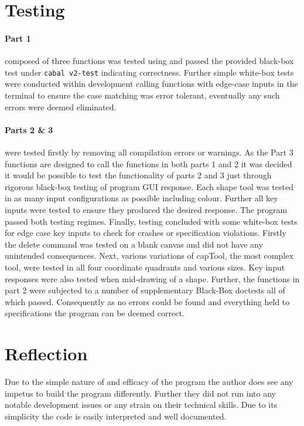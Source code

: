 \documentclass[11pt]{article}
\begin{document}

\section{Testing}%
\paragraph{Part 1} 
 composed of three functions was tested using and passed the provided black-box test under \verb|cabal v2-test| indicating correctness. Further simple white-box tests were conducted within development calling functions with edge-case inputs in the terminal to ensure the case matching was error tolerant, eventually any such errors were deemed eliminated.
 
\paragraph{Parts 2 \& 3} 
were tested firstly by removing all compilation errors or warnings. As the Part 3 functions are designed to call the functions in both parts 1 and 2 it was decided it would be possible to test the functionality of parts 2 and 3 just through rigorous black-box testing of program GUI response. Each shape tool was tested in as many input configurations as possible including colour. Further all key inputs were tested to ensure they produced the desired response. The program passed both testing regimes. Finally, testing concluded with some white-box tests for edge case key inputs to check for crashes or specification violations. Firstly the delete command was tested on a blank canvas and did not have any unintended consequences. Next, various variations of capTool, the most complex tool, were tested in all four coordinate quadrants and various sizes. Key input responses were also tested when mid-drawing of a shape. Further, the functions in part 2 were subjected to a number of  supplementary Black-Box doctests all of which passed. Consequently as no errors could be found and everything held to specifications the program can be deemed correct.
\section{Reflection}
Due to the simple nature of and efficacy of the program the author does see any impetus to build the program differently. Further they did not run into any notable development issues or any strain on their technical skills. Due to its simplicity the code is easily interpreted and well documented.


\end{document}
